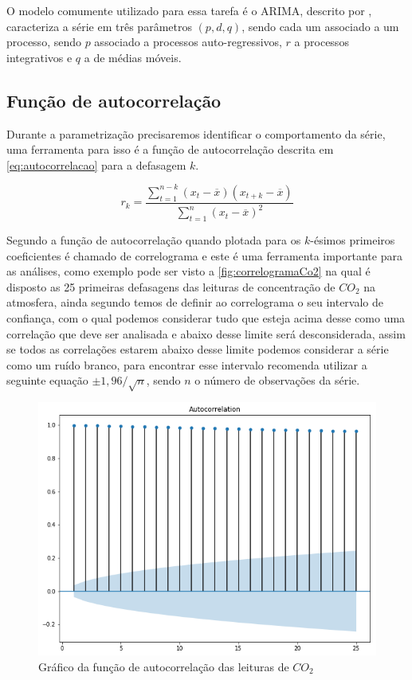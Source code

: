 \documentclass[
    12pt,
    oneside,
    a4paper,
    english,
    brazil
]{abntex2}
\begin{document}
O modelo comumente utilizado para essa tarefa é o ARIMA, descrito por 
, caracteriza a série em três parâmetros $(p,d,q)$, sendo cada 
um associado a um processo, sendo $p$ associado a processos auto-regressivos, 
$r$ a processos integrativos e $q$ a de médias móveis.

\subsection{Função de autocorrelação}\label{sec:corre}

Durante a parametrização precisaremos identificar o comportamento da série, uma 
ferramenta para isso é a função de autocorrelação descrita em 
\autoref{eq:autocorrelacao} para a defasagem $k$.

\begin{equation}
    \label{eq:autocorrelacao}
    r_k = \frac{\sum_{t=1}^{n-k}{(x_t - \overline{x})(x_{t+k} - 
    \overline{x})}}{\sum_{t=1}^{n}{(x_t - \overline{x})^2}}
\end{equation}

Segundo  a função de autocorrelação quando plotada para os 
$k$-ésimos primeiros coeficientes é chamado de correlograma e este é uma 
ferramenta importante para as análises, como exemplo pode ser visto a 
\autoref{fig:correlogramaCo2} na qual é disposto as 25 primeiras defasagens das 
leituras de concentração de $CO_2$ na atmosfera, ainda segundo 
 temos de definir ao correlograma o seu intervalo de 
confiança, com o qual podemos considerar tudo que esteja acima desse como uma 
correlação que deve ser analisada e abaixo desse limite será desconsiderada, 
assim se todos as correlações estarem abaixo desse limite podemos considerar a 
série como um ruído branco, para encontrar esse intervalo  
recomenda utilizar a seguinte equação $\pm{}1,96/\sqrt{n}$, sendo $n$ o número 
de observações da série.

\begin{figure}
    \centering
    \caption{Gráfico da função de autocorrelação das leituras de 
    $CO_2$}\label{fig:correlogramaCo2}
    \includegraphics[width=.6\linewidth]{images/acf_co2.png}
\end{figure}
\end{document}
